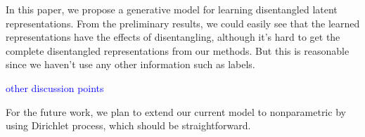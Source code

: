 In this paper, we propose a generative model for learning disentangled latent representations. From the preliminary results, we could easily see that the learned representations have the effects of disentangling, although it's hard to get the complete disentangled representations from our methods. But this is reasonable since we haven't use any other information such as labels.  

\textcolor{blue}{other discussion points}

For the future work, we plan to extend our current model to nonparametric by using Dirichlet process, which should be straightforward.  